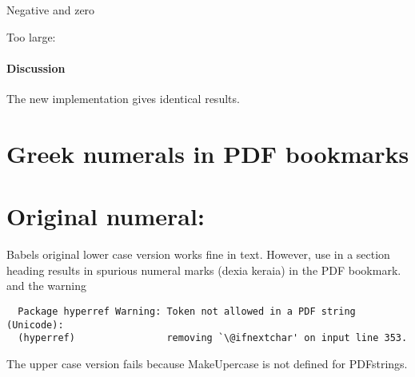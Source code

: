 \documentclass[a4paper]{scrartcl}
\let\origgreeknumeral\greeknumeral
\let\origGreeknumeral\Greeknumeral
\begin{document}
Negative and zero

Too large:

\paragraph{Discussion}

The new implementation gives identical results.

\section{Greek numerals in PDF bookmarks}

\section{
}

\section{
}
\section{
}

\section{
}

\section{
}

\section{Original numeral: 
  \greekscript{\origgreeknumeral{1293}}
}

Babels original lower case version works fine in text. However, use in a
section heading results in spurious numeral marks (dexia keraia) in the
PDF bookmark. and the warning
\begin{verbatim}
  Package hyperref Warning: Token not allowed in a PDF string (Unicode):
  (hyperref)                removing `\@ifnextchar' on input line 353.
\end{verbatim}

The upper case version fails because MakeUpercase is not defined for
PDFstrings.
\end{document}
